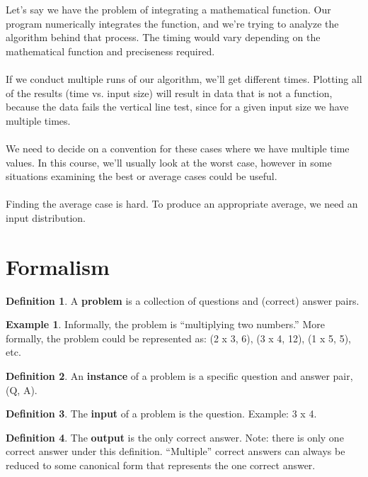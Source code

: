 \documentclass[]{article}
\theoremstyle{definition}
\newtheorem{defn}{Definition}[section]
\newtheorem{ex}{Example}[section]
\newcommand{\lecture}[1]{\marginpar{{\footnotesize $\leftarrow$ \underline{#1}}}}
\begin{document}
			Let's say we have the problem of integrating a mathematical function. Our program numerically integrates the function, and we're trying to analyze the algorithm behind that process. The timing would vary depending on the mathematical function and preciseness required.
			\\ \\
			If we conduct multiple runs of our algorithm, we'll get different times. Plotting all of the results (time vs. input size) will result in data that is not a function, because the data fails the vertical line test, since for a given input size we have multiple times.
			\\ \\
			We need to decide on a convention for these cases where we have multiple time values. In this course, we'll usually look at the worst case, however in some situations examining the best or average cases could be useful.
			\\ \\
			Finding the average case is hard. To produce an appropriate average, we need an input distribution.
	\section{Formalism} \lecture{January 15, 2013}
		\begin{defn}
			A \textbf{problem} is a collection of questions and (correct) answer pairs.
		\end{defn}

		\begin{ex}
			Informally, the problem is ``multiplying two numbers.'' More formally, the problem could be represented as: (2 x 3, 6), (3 x 4, 12), (1 x 5, 5), etc.
		\end{ex}

		\begin{defn}
			An \textbf{instance} of a problem is a specific question and answer pair, (Q, A).
		\end{defn}

		\begin{defn}
			The \textbf{input} of a problem is the question. Example: 3 x 4.
		\end{defn}

		\begin{defn}
			The \textbf{output} is the only correct answer. Note: there is only one correct answer under this definition. ``Multiple'' correct answers can always be reduced to some canonical form that represents the one correct answer.
		\end{defn}
\end{document}
